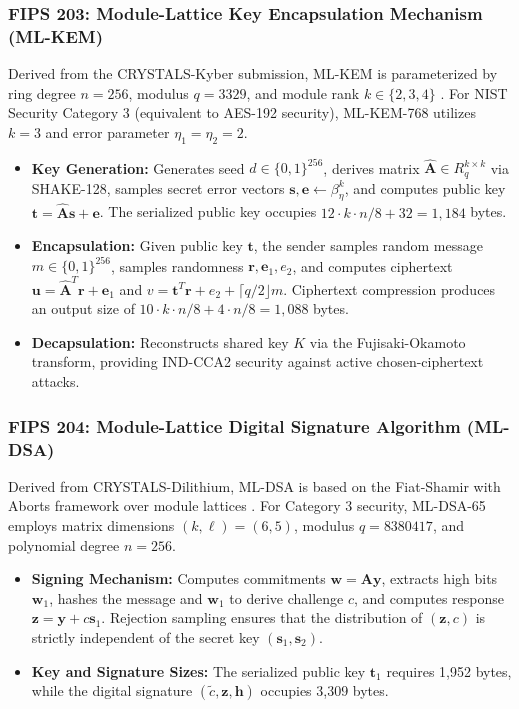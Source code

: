 \subsubsection{FIPS 203: Module-Lattice Key Encapsulation Mechanism (ML-KEM)}
Derived from the CRYSTALS-Kyber submission, ML-KEM is parameterized by ring degree $n=256$, modulus $q=3329$, and module rank $k \in \{2, 3, 4\}$ \cite{nist_fips203}. For NIST Security Category 3 (equivalent to AES-192 security), ML-KEM-768 utilizes $k=3$ and error parameter $\eta_1 = \eta_2 = 2$.
\begin{itemize}
    \item \textbf{Key Generation:} Generates seed $d \in \{0,1\}^{256}$, derives matrix $\hat{\mathbf{A}} \in R_q^{k \times k}$ via SHAKE-128, samples secret error vectors $\mathbf{s}, \mathbf{e} \leftarrow \beta_\eta^k$, and computes public key $\mathbf{t} = \hat{\mathbf{A}}\mathbf{s} + \mathbf{e}$. The serialized public key occupies $12 \cdot k \cdot n / 8 + 32 = 1,184$ bytes.
    \item \textbf{Encapsulation:} Given public key $\mathbf{t}$, the sender samples random message $m \in \{0,1\}^{256}$, samples randomness $\mathbf{r}, \mathbf{e}_1, e_2$, and computes ciphertext $\mathbf{u} = \hat{\mathbf{A}}^T \mathbf{r} + \mathbf{e}_1$ and $v = \mathbf{t}^T \mathbf{r} + e_2 + \lceil q/2 \rfloor m$. Ciphertext compression produces an output size of $10 \cdot k \cdot n / 8 + 4 \cdot n / 8 = 1,088$ bytes.
    \item \textbf{Decapsulation:} Reconstructs shared key $K$ via the Fujisaki-Okamoto transform, providing IND-CCA2 security against active chosen-ciphertext attacks.
\end{itemize}

\subsubsection{FIPS 204: Module-Lattice Digital Signature Algorithm (ML-DSA)}
Derived from CRYSTALS-Dilithium, ML-DSA is based on the Fiat-Shamir with Aborts framework over module lattices \cite{nist_fips204}. For Category 3 security, ML-DSA-65 employs matrix dimensions $(k, \ell) = (6, 5)$, modulus $q = 8380417$, and polynomial degree $n=256$.
\begin{itemize}
    \item \textbf{Signing Mechanism:} Computes commitments $\mathbf{w} = \mathbf{A}\mathbf{y}$, extracts high bits $\mathbf{w}_1$, hashes the message and $\mathbf{w}_1$ to derive challenge $c$, and computes response $\mathbf{z} = \mathbf{y} + c\mathbf{s}_1$. Rejection sampling ensures that the distribution of $(\mathbf{z}, c)$ is strictly independent of the secret key $(\mathbf{s}_1, \mathbf{s}_2)$.
    \item \textbf{Key and Signature Sizes:} The serialized public key $\mathbf{t}_1$ requires 1,952 bytes, while the digital signature $(\tilde{c}, \mathbf{z}, \mathbf{h})$ occupies 3,309 bytes.
\end{itemize}

